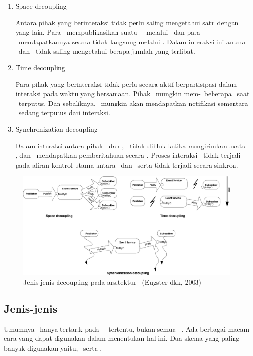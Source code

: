 \begin{enumerate}[noitemsep,nolistsep,leftmargin=0cm,itemindent=.5cm,listparindent=\parindent]
    \item \f{Space decoupling}

    Antara pihak yang berinteraksi tidak perlu saling mengetahui satu dengan
    yang lain. Para \publisher~mempublikasikan suatu \event~\pubsub~melalui
    \eventservice~dan para \subscriber~mendapatkannya secara tidak langsung
    melalui \eventservice.  Dalam interaksi ini antara \publisher~dan
    \subscriber~tidak saling mengetahui berapa jumlah yang terlibat.  \item \f{Time
    decoupling}
    
    Para pihak yang berinteraksi tidak perlu secara aktif berpartisipasi dalam
    interaksi pada waktu yang bersamaan. Pihak \publisher~mungkin
    mem-\publish~beberapa \event~saat \subscriber~terputus. Dan sebaliknya,
    \subscriber~mungkin akan mendapatkan notifikasi sementara \publisher~sedang
    terputus dari interaksi.  \item \f{Synchronization decoupling}
    
    Dalam interaksi antara pihak \publisher~dan \subscriber, \publisher~tidak diblok
    ketika mengirimkan suatu \event, dan \subscriber~mendapatkan pemberitahuan secara
    \asynch. Proses interaksi \event~tidak terjadi pada aliran kontrol utama antara
    \publisher~dan \subscriber~serta tidak terjadi secara sinkron.
\end{enumerate}
\begin{figure}
    \centering
    \includegraphics[scale=0.10]
        {pics/decoupling.png}
    \caption{Jenis-jenis \f{decoupling} pada arsitektur \pubsub~(Eugster dkk, 2003)}
    \label{fig:decoupling}
\end{figure}

\subsection{Jenis-jenis \PubSub}
Umumnya \subscriber~hanya tertarik pada \event~\pubsub~tertentu, bukan semua \event~\pubsub.
Ada berbagai macam cara yang dapat digunakan dalam menentukan hal ini. 
Dua skema yang paling banyak digunakan yaitu, \topicbased~serta \contentbased. 

